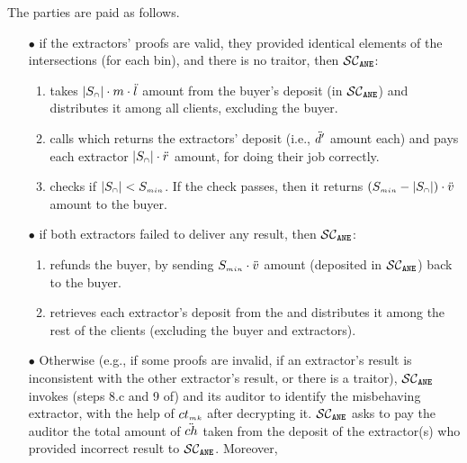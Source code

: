 



\item The parties are paid as follows. 

\begin{itemize}
%
\item[$\bullet$]  if the extractors' proofs are valid, they provided identical elements of the intersections (for each bin), and there is no traitor, then $\mathcal{SC}_{\mathtt{ANE}}$:
\begin{enumerate}
%
 \item takes $|S_{\scriptscriptstyle\cap}|\cdot m\cdot \ddot{l}$ amount from the buyer's deposit (in $\mathcal{SC}_{\mathtt{ANE}}$) and distributes it among all clients, excluding the buyer. 
 \item calls \SCpc which returns the extractors' deposit (i.e., $\ddot{d}'$ amount each) and pays each extractor $|S_{\scriptscriptstyle\cap}|\cdot \ddot{r}$ amount, for doing their job correctly. 
 \item checks if $|{ { {S}}}_{\scriptscriptstyle\cap}|<S_{\scriptscriptstyle min}$. If the check passes, then it returns $(S_{\scriptscriptstyle min}-|S_{\scriptscriptstyle\cap}|)\cdot \ddot{v}$ amount  to the buyer.
 \end{enumerate}
% 
\item[$\bullet$] if both extractors failed to deliver any result, then $\mathcal{SC}_{\mathtt{ANE}}$:
%
\begin{enumerate}
%
\item refunds the buyer, by sending $S_{\scriptscriptstyle min}\cdot \ddot{v}$ amount (deposited in $\mathcal{SC}_{\mathtt{ANE}}$) back to the buyer. 
%
\item retrieves each extractor's deposit from the \SCpc and distributes it among the rest of the clients (excluding the buyer and extractors).  
%
 \end{enumerate}
 \item[$\bullet$]\label{smart-PSI-inconsistency} Otherwise (e.g., if some proofs are invalid, if an extractor's result is inconsistent with the other extractor's result, or there is a traitor), $\mathcal{SC}_{\mathtt{ANE}}$ invokes (steps 8.c and 9 of) \SCpc and its auditor to identify the misbehaving extractor, with the help of $ct_{\scriptscriptstyle mk}$ after decrypting it. $\mathcal{SC}_{\mathtt{ANE}}$ asks \SCpc to pay the auditor the total amount of $\ddot{ch}$ taken from the deposit of the extractor(s) who provided incorrect result to $\mathcal{SC}_{\mathtt{ANE}}$. Moreover,
%


\end{itemize}
